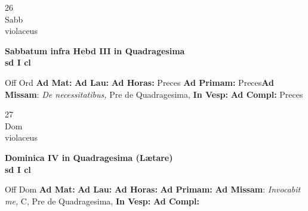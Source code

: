 \documentclass[10pt, openany]{book}
\begin{document}
        \begin{center}
            \begin{minipage}{3.5in}
                \vspace{2em}
                \begin{minipage}{0.5in}
                    {\Huge 26} \\
                    {\normalsize Sabb} \\
                    {\normalsize violaceus}
                \end{minipage}
                \begin{minipage}{3.0in}
                    \textbf{ \large Sabbatum infra Hebd III in Quadragesima \\
                    \textnormal{\normalsize sd I cl}} \\ 
                \end{minipage}
                \begin{justify}Off Ord
                    \textbf{Ad Mat: }
                    \textbf{Ad Lau: }
                    \textbf{Ad Horas: }Preces
                    \textbf{Ad Primam: }Preces\textbf{Ad Missam}: \textit{De necessitatibus,} Pre de Quadragesima,  
                    \textbf{In Vesp: }
                    \textbf{Ad Compl: }Preces
                \end{justify}
            \end{minipage}
        \end{center}
    
        \begin{center}
            \begin{minipage}{3.5in}
                \vspace{2em}
                \begin{minipage}{0.5in}
                    {\Huge 27} \\
                    {\normalsize Dom} \\
                    {\normalsize violaceus}
                \end{minipage}
                \begin{minipage}{3.0in}
                    \textbf{ \large Dominica IV in Quadragesima (Lætare) \\
                    \textnormal{\normalsize sd I cl}} \\ 
                \end{minipage}
                \begin{justify}Off Dom
                    \textbf{Ad Mat: }
                    \textbf{Ad Lau: }
                    \textbf{Ad Horas: }
                    \textbf{Ad Primam: }\textbf{Ad Missam}: \textit{Invocabit me,} C, Pre de Quadragesima,  
                    \textbf{In Vesp: }
                    \textbf{Ad Compl: }
                \end{justify}
            \end{minipage}
        \end{center}
    
\end{document}
